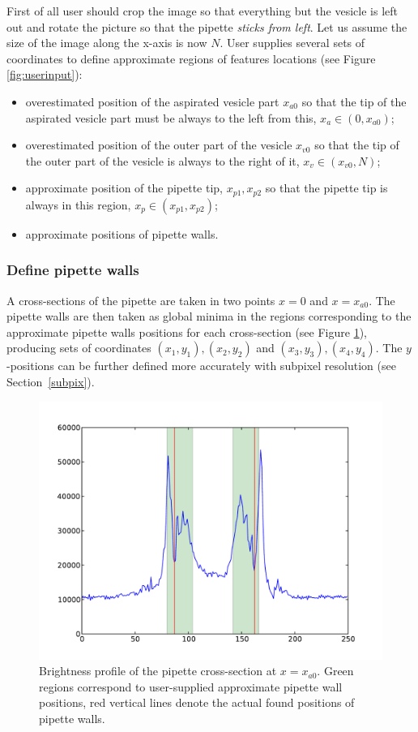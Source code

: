 First of all user should crop the image so that everything but the vesicle is left out and rotate the picture so that the pipette \emph{sticks from left}. Let us assume the size of the image along the x-axis is now $N$. User supplies several sets of coordinates to define approximate regions of features locations (see Figure \ref{fig:userinput}):
\begin{itemize}
	\item overestimated position of the aspirated vesicle part $x_{a0}$ so that the tip of the aspirated vesicle part must be always to the left from this, $ x_a \in (0, x_{a0})$;
	\item overestimated position of the outer part of the vesicle $x_{v0}$ so that the tip of the outer part of the vesicle is always to the right of it, $ x_v \in (x_{v0}, N)$;
	\item approximate position of the pipette tip, $x_{p1}, x_{p2}$ so that the pipette tip is always in this region, $ x_p \in (x_{p1}, x_{p2})$;
	\item approximate positions of pipette walls.
\end{itemize}

\subsubsection{Define pipette walls}\label{pipwalls}
A cross-sections of the pipette are taken in two points $x=0$ and $x=x_{a0}$. The pipette walls are then taken as global minima in the regions corresponding to the approximate pipette walls positions for each cross-section (see Figure \ref{fig:pipcrosssection}), producing sets of coordinates $(x_1,y_1), (x_2,y_2)$ and $(x_3,y_3), (x_4,y_4)$. The $y$-positions can be further defined more accurately with subpixel resolution (see Section~\ref{subpix}).

\begin{figure}%
	\includegraphics[width=\columnwidth]{figs/pipcrosssection.pdf}%
	\caption{Brightness profile of the pipette cross-section at $x=x_{a0}$. Green regions correspond to user-supplied approximate pipette wall positions, red vertical lines denote the actual found positions of pipette walls.}%
	\label{fig:pipcrosssection}%
\end{figure}

